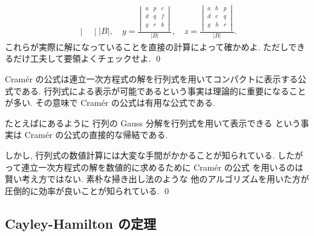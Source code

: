 \documentclass[12pt,twoside]{jarticle}
\begin{document}
\begin{question}
\begin{align*}
{\begin{vmatrix}
      \end{vmatrix}
      }{|B|},
    \quad
    y = \frac{
      \begin{vmatrix}
        a & p & c \\ 
        d & q & f \\
        g & r & k \\
      \end{vmatrix}
      }{|B|},
    \quad
    z = \frac{
      \begin{vmatrix}
        a & b & p \\ 
        d & e & q \\
        g & h & r \\
      \end{vmatrix}
      }{|B|}.
  \end{align*}
  これらが実際に解になっていることを直接の計算によって確かめよ. 
  ただしできるだけ工夫して要領よくチェックせよ.
  \qed
\end{question}


\begin{guide}
  Cram\'er の公式は連立一次方程式の解を行列式を用いてコンパクトに表示する公
  式である.  行列式による表示が可能であるという事実は理論的に重要になること
  が多い.  その意味で Cram\'er の公式は有用な公式である.

  たとえばにあるように
  行列の Gauss 分解を行列式を用いて表示できる
  という事実は Cram\'er の公式の直接的な帰結である.

  しかし, 行列式の数値計算には大変な手間がかかることが知られている.
  したがって連立一次方程式の解を数値的に求めるために Cram\'er の公式
  を用いるのは賢い考え方ではない. 素朴な掃き出し法のような
  他のアルゴリズムを用いた方が圧倒的に効率が良いことが知られている.
  \qed
\end{guide}


\subsection{Cayley-Hamilton の定理}
\label{sec:CH}
\end{document}
